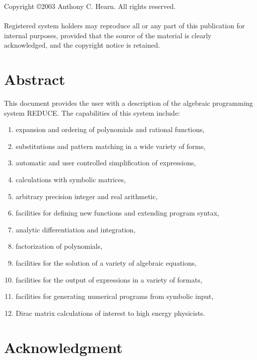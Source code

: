 \documentclass[11pt,letterpaper]{book}
\newcommand{\REDUCE}{REDUCE}
\begin{document}
\newpage
\vspace*{3.0in}
\noindent Copyright \copyright 2003 Anthony C. Hearn.  All rights reserved. \\
\mbox{}\\
%
\noindent Registered system holders may reproduce all or any part of this
publication for internal purposes, provided that the source of the
material is clearly acknowledged, and the copyright notice is retained.

\pagestyle{headings}

\chapter*{Abstract}


This document provides the user with a description of the algebraic
programming system {\REDUCE}.  The capabilities of this system include:
\begin{enumerate}
\item expansion and ordering of polynomials and rational functions,
\item substitutions and pattern matching in a wide variety of forms,
\item automatic and user controlled simplification of expressions,
\item calculations with symbolic matrices,
\item arbitrary precision integer and real arithmetic,
\item facilities for defining new functions and extending program syntax,
\item analytic differentiation and integration,
\item factorization of polynomials,
\item facilities for the solution of a variety of algebraic equations,
\item facilities for the output of expressions in a variety of formats,
\item facilities for generating numerical programs from symbolic input,
\item Dirac matrix calculations of interest to high energy physicists.
\end{enumerate}

\chapter*{Acknowledgment}
\end{document}
